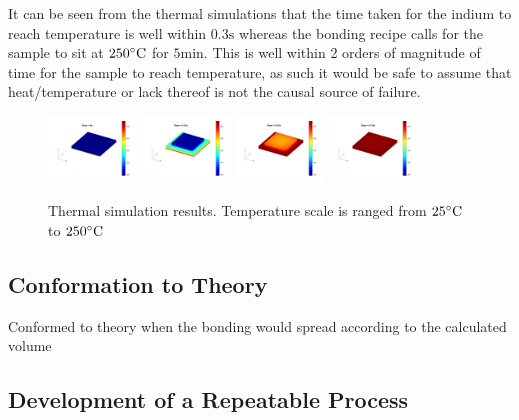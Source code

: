 It can be seen from the thermal simulations that the time taken for the indium to reach temperature is well within $0.3 \unit{\second}$ whereas the bonding recipe calls for the sample to sit at $250 \dC$ for $5 \unit{\minute}$. This is well within 2 orders of magnitude of time for the sample to reach temperature, as such it would be safe to assume that heat/temperature or lack thereof is not the causal source of failure.


\begin{figure}
    \centering
    \includegraphics[width=0.21\textwidth]{Main/Ch2/heat/001.png}
    \includegraphics[width=0.21\textwidth]{Main/Ch2/heat/002.png}
    \includegraphics[width=0.21\textwidth]{Main/Ch2/heat/008.png}
    \includegraphics[width=0.21\textwidth]{Main/Ch2/heat/020.png}
    \caption{Thermal simulation results. Temperature scale is ranged from $25 \dC$ to $250 \dC$}
    \label{fig:thermal_simulations}
\end{figure}


\subsection{Conformation to Theory}
Conformed to theory when the bonding would spread according to the calculated volume

\subsection{Development of a Repeatable Process}
